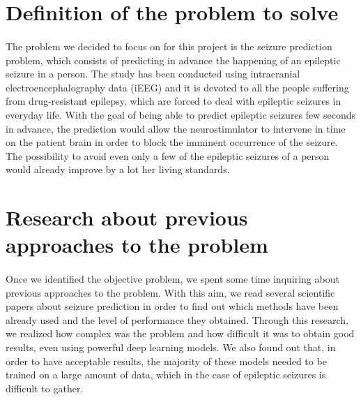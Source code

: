 
\section{Definition of the problem to solve} \label{sec: step_definition_problem_to_solve}
\paragraph{} The problem we decided to focus on for this project is the seizure prediction problem, which consists of predicting in advance the happening of an epileptic seizure in a person. The study has been conducted using intracranial electroencephalography data (iEEG) and it is devoted to all the people suffering from drug-resistant epilepsy, which are forced to deal with epileptic seizures in everyday life. With the goal of being able to predict epileptic seizures few seconds in advance, the prediction would allow the neurostimulator to intervene in time on the patient brain in order to block the imminent occurrence of the seizure. The possibility to avoid even only a few of the epileptic seizures of a person would already improve by a lot her living standards.


\section{Research about previous approaches to the problem} \label{sec: step_research_about_previous_approaches}
\paragraph{} Once we identified the objective problem, we spent some time inquiring about previous approaches to the problem. With this aim, we read several scientific papers about seizure prediction in order to find out which methods have been already used and the level of performance they obtained. Through this research, we realized how complex was the problem and how difficult it was to obtain good results, even using powerful deep learning models. We also found out that, in order to have acceptable results, the majority of these models needed to be trained on a large amount of data, which in the case of epileptic seizures is difficult to gather.

